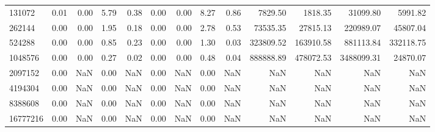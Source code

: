 \begin{tabular}{lrrrrrrrrrrrr}
131072 & 0.01 & 0.00 & 5.79 & 0.38 & 0.00 & 0.00 & 8.27 & 0.86 & 7829.50 & 1818.35 & 31099.80 & 5991.82 \\
262144 & 0.00 & 0.00 & 1.95 & 0.18 & 0.00 & 0.00 & 2.78 & 0.53 & 73535.35 & 27815.13 & 220989.07 & 45807.04 \\
524288 & 0.00 & 0.00 & 0.85 & 0.23 & 0.00 & 0.00 & 1.30 & 0.03 & 323809.52 & 163910.58 & 881113.84 & 332118.75 \\
1048576 & 0.00 & 0.00 & 0.27 & 0.02 & 0.00 & 0.00 & 0.48 & 0.04 & 888888.89 & 478072.53 & 3488099.31 & 24870.07 \\
2097152 & 0.00 & NaN & 0.00 & NaN & 0.00 & NaN & 0.00 & NaN & NaN & NaN & NaN & NaN \\
4194304 & 0.00 & NaN & 0.00 & NaN & 0.00 & NaN & 0.00 & NaN & NaN & NaN & NaN & NaN \\
8388608 & 0.00 & NaN & 0.00 & NaN & 0.00 & NaN & 0.00 & NaN & NaN & NaN & NaN & NaN \\
16777216 & 0.00 & NaN & 0.00 & NaN & 0.00 & NaN & 0.00 & NaN & NaN & NaN & NaN & NaN \\
\bottomrule
\end{tabular}
